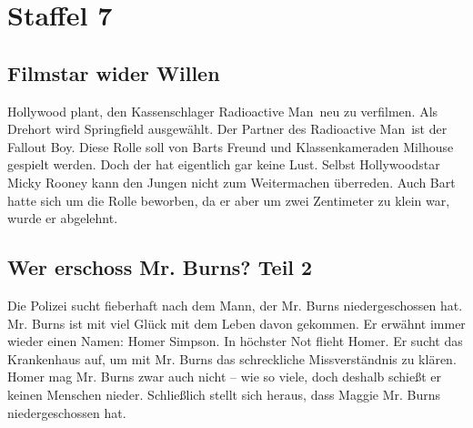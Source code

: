 \section{Staffel 7}

\subsection{Filmstar wider Willen}\label{2F17}
Hollywood plant, den Kassenschlager \glqq Radioactive Man\grqq\ neu zu verfilmen. Als Drehort wird Springfield ausgewählt. Der Partner des \glqq Radioactive Man\grqq\ ist der \glqq Fallout Boy\grqq{}. Diese Rolle soll von Barts Freund und Klassenkameraden Milhouse gespielt werden. Doch der hat eigentlich gar keine Lust. Selbst Hollywoodstar Micky Rooney kann den Jungen nicht zum Weitermachen überreden. Auch Bart hatte sich um die Rolle beworben, da er aber um zwei Zentimeter zu klein war, wurde er abgelehnt.

	
\subsection{Wer erschoss Mr. Burns? Teil 2}\label{2F20}
Die Polizei sucht fieberhaft nach dem Mann, der Mr. Burns niedergeschossen hat. Mr. Burns ist mit viel Glück mit dem Leben davon gekommen. Er erwähnt immer wieder einen Namen: Homer Simpson. In höchster Not flieht Homer. Er sucht das Krankenhaus auf, um mit Mr. Burns das schreckliche Missverständnis zu klären. Homer mag Mr. Burns zwar auch nicht -- wie so viele, doch deshalb schießt er keinen Menschen nieder. Schließlich stellt sich heraus, dass Maggie Mr. Burns niedergeschossen hat.

